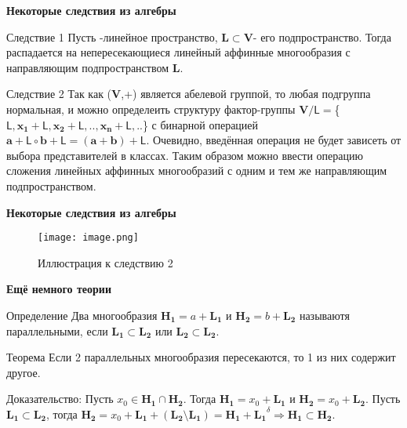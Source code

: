 \documentclass{beamer}
\begin{document}
\begin{frame}{\textbf{Некоторые следствия из алгебры}}


\begin{block}{Следствие 1}
Пусть -линейное пространство, $\mathbf{L}\subset \mathbf{V}$- его подпространство. Тогда  распадается на непересекающиеся линейный аффинные многообразия с направляющим подпространством $\mathbf{L}$.
\end{block}


\begin{block}{Следствие 2}
 Так как ($\mathbf{V}$,+) является абелевой группой, то любая подгруппа нормальная, и можно определеить структуру фактор-группы
 $\mathbf{V}/\mathsf{L}=$\{$\mathsf{L},\mathbf{x_1}+\mathsf{L},\mathbf{x_2}+\mathsf{L},..,\mathbf{x_n}+\mathsf{L},..$\} с бинарной операцией $\mathbf{a}+\mathsf{L}\circ \mathbf{b}+\mathsf{L}=(\mathbf{a}+\mathbf{b})+\mathsf{L}$. Очевидно, введённая операция не будет зависеть от выбора представителей в классах. Таким образом можно ввести операцию сложения линейных аффинных многообразий с одним и тем же направляющим подпространством.
\end{block}


\end{frame}


\begin{frame}{\textbf{Некоторые следствия из алгебры}}
\begin{figure}[h]

\centering

\texttt{[image: image.png]}


Иллюстрация к следствию 2
\label{fig:mpr}

\end{figure}

\end{frame}


\begin{frame}{\textbf{Ещё немного теории}}
\begin{block}{Определение}
    Два многообразия $\mathbf{H_1}=a+\mathbf{L_1}$ и $\mathbf{H_2}=b+\mathbf{L_2}$ называютя параллельными, если $\mathbf{L_1} \subset \mathbf{L_2}$ или $\mathbf{L_2} \subset \mathbf{L_2}$.
\end{block}
\begin{block}{Теорема}
    Если 2 параллельных многообразия пересекаются, то 1 из них содержит другое.
\end{block}
\begin{block}{Доказательство:}
Пусть $x_0\in\mathbf{H_1}\cap\mathbf{H_2}$. Тогда $\mathbf{H_1}=x_0+\mathbf{L_1}$ и $\mathbf{H_2}=x_0+\mathbf{L_2}$. Пусть $\mathbf{L_1} \subset \mathbf{L_2}$, тогда $\mathbf{H_2}=x_0+\mathbf{L_1}+(\mathbf{L_2}\setminus \mathbf{L_1})=\mathbf{H_1}+\mathbf{L_1}^\delta
\Rightarrow \mathbf{H_1} \subset \mathbf{H_2}$.
\end{block}
\end{frame}
\end{document}
